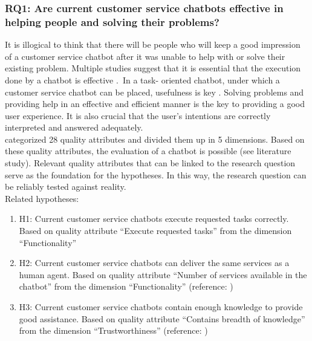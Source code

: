 \subsubsection{RQ1: Are current customer service chatbots effective in helping people and solving their problems?}
It is illogical to think that there will be people who will keep a good impression of a customer service chatbot after it was unable to help with or solve their existing problem. Multiple studies suggest that it is essential that the execution done by a chatbot is effective \citep*{Muizzah2021, Brandtzaeg2018}.\
In a task- oriented chatbot, under which a customer service chatbot can be placed, usefulness is key \citep{brandtzaeg2020}. Solving problems and providing help in an effective and efficient manner is the key to providing a good user experience. It is also crucial that the user's intentions are correctly interpreted and answered adequately.\\
\break
\citep{Verkeyn2018} categorized 28 quality attributes and divided them up in 5 dimensions. Based on these quality attributes, the evaluation of a chatbot is possible (see literature study). Relevant quality attributes that can be linked to the research question serve as the foundation for the hypotheses. In this way, the research question can be reliably tested against reality.\\
\break
\break
Related hypotheses:
\begin{enumerate}
	\item H1: Current customer service chatbots execute requested tasks correctly. Based on \citep{Verkeyn2018} quality attribute “Execute requested tasks” from the dimension “Functionality”
	\item H2: Current customer service chatbots can deliver the same services as a human agent. Based on \citep{Verkeyn2018} quality attribute “Number of services available in the chatbot” from the dimension “Functionality” (reference: \citep{Eeuwen2017})
	\item H3: Current customer service chatbots contain enough knowledge to provide good assistance. Based on \citep{Verkeyn2018} quality attribute “Contains breadth of knowledge” from the dimension “Trustworthiness” (reference: \citep*{Cohen2016, Kuligowska2015})
\end{enumerate}

